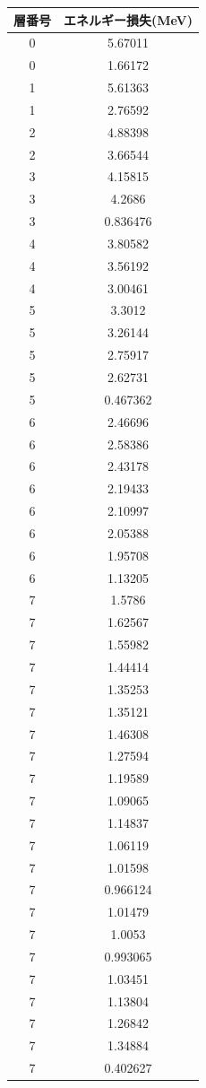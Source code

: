 \documentclass[a4paper]{jsarticle}
\begin{document}
\centering
\begin{tabular}[h]{c|c}
\hline
層番号&エネルギー損失(MeV) \\ \hline
0&5.67011\\
0&1.66172\\
1&5.61363\\
1&2.76592\\
2&4.88398\\
2&3.66544\\
3&4.15815\\
3&4.2686\\
3&0.836476\\
4&3.80582\\
4&3.56192\\
4&3.00461\\
5&3.3012\\
5&3.26144\\
5&2.75917\\
5&2.62731\\
5&0.467362\\
6&2.46696\\
6&2.58386\\
6&2.43178\\
6&2.19433\\
6&2.10997\\
6&2.05388\\
6&1.95708\\
6&1.13205\\
7&1.5786\\
7&1.62567\\
7&1.55982\\
7&1.44414\\
7&1.35253\\
7&1.35121\\
7&1.46308\\
7&1.27594\\
7&1.19589\\
7&1.09065\\
7&1.14837\\
7&1.06119\\
7&1.01598\\
7&0.966124\\
7&1.01479\\
7&1.0053\\
7&0.993065\\
7&1.03451\\
7&1.13804\\
7&1.26842\\
7&1.34884\\
7&0.402627\\
\end{tabular}\\
\end{document}
